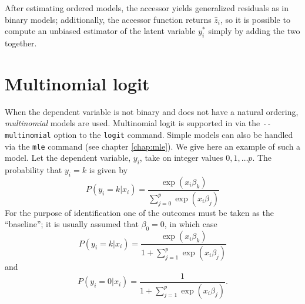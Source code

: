 After estimating ordered models, the  accessor yields
generalized residuals as in binary models; additionally, the
 accessor function returns $\hat{z}_i$, so it is
possible to compute an unbiased estimator of the latent variable
$y^*_i$ simply by adding the two together.

\section{Multinomial logit}
\label{sec:mlogit}

When the dependent variable is not binary and does not have a natural
ordering, \emph{multinomial} models are used.  Multinomial logit is
supported in  via the \verb|--multinomial| option to the
\texttt{logit} command.  Simple models can also be handled via the
\texttt{mle} command (see chapter \ref{chap:mle}). We give here an
example of such a model.  Let the dependent variable, $y_i$, take on
integer values $0,1,\dots p$.  The probability that $y_i = k$ is given
by
\[
  P(y_i = k |  x_i) = \frac{\exp(x_i \beta_k)}{\sum_{j=0}^p \exp(x_i \beta_j)}
\]
For the purpose of identification one of the outcomes must be taken as
the ``baseline''; it is usually assumed that $\beta_0 = 0$, in which case
\[
  P(y_i = k |  x_i) = \frac{\exp(x_i \beta_k)}{1 + \sum_{j=1}^p \exp(x_i \beta_j)} 
\]
and
\[
  P(y_i = 0 |  x_i) = \frac{1}{1 + \sum_{j=1}^p \exp(x_i \beta_j)} .
\]

